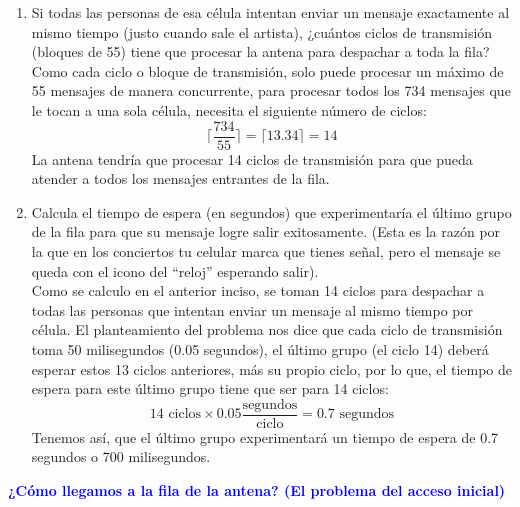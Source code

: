 {\begin{enumerate}
        \item \textcolor{azul}{Si todas las personas de esa célula intentan enviar un
        mensaje exactamente al mismo tiempo (justo cuando sale el artista),
        ¿cuántos ciclos de transmisión (bloques de 55) tiene que procesar
        la antena para despachar a toda la fila?}\\
        Como cada ciclo o bloque de transmisión, solo puede procesar un máximo de 55 mensajes de manera concurrente, para procesar todos los 734 mensajes que le tocan a una sola célula, necesita el siguiente número de ciclos:
        \begin{equation*}
            \lceil \frac{734}{55} \rceil = \lceil 13.34 \rceil = 14
        \end{equation*}
        La antena tendría que procesar 14 ciclos de transmisión para que pueda atender a todos los mensajes entrantes de la fila.
        
        \item \textcolor{azul}{Calcula el tiempo de espera (en segundos) que experimentaría
        el último grupo de la fila para que su mensaje logre salir
        exitosamente. (Esta es la razón por la que en los conciertos tu
        celular marca que tienes señal, pero el mensaje se queda con el
        icono del ``reloj'' esperando salir).} \\
        Como se calculo en el anterior inciso, se toman 14 ciclos para despachar a todas las personas que intentan enviar un mensaje al mismo tiempo por célula. El planteamiento del problema nos dice que cada ciclo de transmisión toma 50 milisegundos (0.05 segundos), el último grupo (el ciclo 14) deberá esperar estos 13 ciclos anteriores, más su propio ciclo, por lo que, el tiempo de espera para este último grupo tiene que ser para 14 ciclos:
        \begin{equation*}
            14 \text{ ciclos} \times 0.05 \frac{\text{segundos}}{\text{ciclo}} = 0.7 \text{ segundos}
        \end{equation*}
        Tenemos así, que el último grupo experimentará un tiempo de espera de 0.7 segundos o 700 milisegundos.
    \end{enumerate}


    \textcolor{blue}{\textbf{¿Cómo llegamos a la fila de la antena? (El problema del
    acceso inicial)}}\\

}

